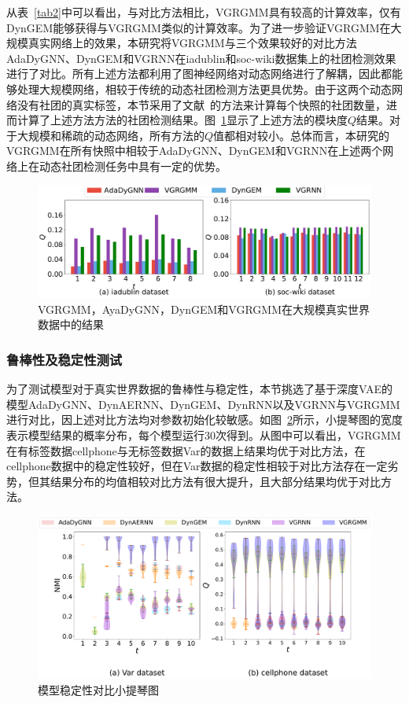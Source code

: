 从表~\ref{tab2}中可以看出，与对比方法相比，VGRGMM具有较高的计算效率，仅有DynGEM能够获得与VGRGMM类似的计算效率。为了进一步验证VGRGMM在大规模真实网络上的效果，本研究将VGRGMM与三个效果较好的对比方法AdaDyGNN、DynGEM和VGRNN在iadublin和soc-wiki数据集上的社团检测效果进行了对比。所有上述方法都利用了图神经网络对动态网络进行了解耦，因此都能够处理大规模网络，相较于传统的动态社团检测方法更具优势。由于这两个动态网络没有社团的真实标签，本节采用了文献~\cite{Krzakala.2013.Zhang}的方法来计算每个快照的社团数量，进而计算了上述方法方法的社团检测结果。图~\ref{fig:iadublin}显示了上述方法的模块度$Q$结果。对于大规模和稀疏的动态网络，所有方法的$Q$值都相对较小。总体而言，本研究的VGRGMM在所有快照中相较于AdaDyGNN、DynGEM和VGRNN在上述两个网络上在动态社团检测任务中具有一定的优势。

\begin{figure}[h]
	\centering
	\includegraphics[width=.8\textwidth]{figures/chap06/chap5bigdata-ia-soc.pdf}
	\caption{VGRGMM，AyaDyGNN，DynGEM和VGRGMM在大规模真实世界数据中的结果}
	\label{fig:iadublin}
\end{figure}

\subsubsection{鲁棒性及稳定性测试}
为了测试模型对于真实世界数据的鲁棒性与稳定性，本节挑选了基于深度VAE的模型AdaDyGNN、DynAERNN、DynGEM、DynRNN以及VGRNN与VGRGMM进行对比，因上述对比方法均对参数初始化较敏感。如图~\ref{fig:STNQ}所示，小提琴图的宽度表示模型结果的概率分布，每个模型运行$30$次得到。从图中可以看出，VGRGMM在有标签数据cellphone与无标签数据Var的数据上结果均优于对比方法，在cellphone数据中的稳定性较好，但在Var数据的稳定性相较于对比方法存在一定劣势，但其结果分布的均值相较对比方法有很大提升，且大部分结果均优于对比方法。

\begin{figure}[htbp]
	\centering
	\includegraphics[width=.66\textwidth]{figures/chap06/chap5STNQ.pdf}
	\caption{模型稳定性对比小提琴图}
	\label{fig:STNQ}
\end{figure}

